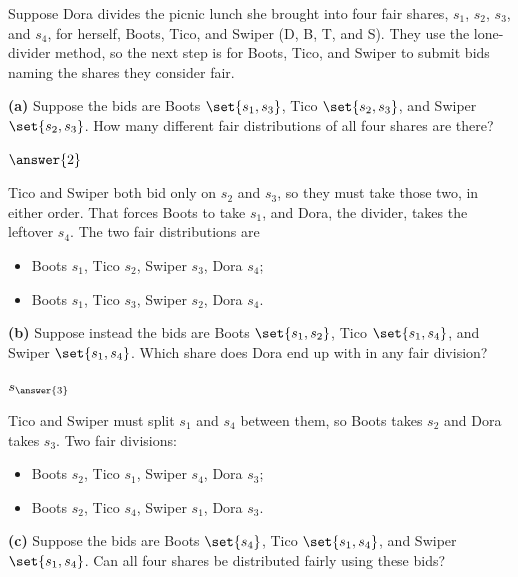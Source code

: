 \documentclass[12pt]{ximera}
\begin{document}
\begin{problem}
Suppose Dora divides the picnic lunch she brought into four fair shares, $s_1$, $s_2$,
$s_3$, and $s_4$, for herself, Boots, Tico, and Swiper (D, B, T, and S). They use the
lone-divider method, so the next step is for Boots, Tico, and Swiper to submit bids
naming the shares they consider fair.

\begin{prompt}
\textbf{(a)} Suppose the bids are Boots $\set{s_1,s_3}$, Tico $\set{s_2,s_3}$, and Swiper
$\set{s_2,s_3}$. How many different fair distributions of all four shares are there?

$\answer{2}$

\begin{feedback}
Tico and Swiper both bid only on $s_2$ and $s_3$, so they must take those two, in
either order. That forces Boots to take $s_1$, and Dora, the divider, takes the
leftover $s_4$. The two fair distributions are
\begin{itemize}
\item Boots $s_1$, Tico $s_2$, Swiper $s_3$, Dora $s_4$;
\item Boots $s_1$, Tico $s_3$, Swiper $s_2$, Dora $s_4$.
\end{itemize}
\end{feedback}
\end{prompt}

\begin{prompt}
\textbf{(b)} Suppose instead the bids are Boots $\set{s_1,s_2}$, Tico $\set{s_1,s_4}$, and
Swiper $\set{s_1,s_4}$. Which share does Dora end up with in any fair division?

$s_{\answer{3}}$

\begin{feedback}
Tico and Swiper must split $s_1$ and $s_4$ between them, so Boots takes $s_2$ and Dora
takes $s_3$. Two fair divisions:
\begin{itemize}
\item Boots $s_2$, Tico $s_1$, Swiper $s_4$, Dora $s_3$;
\item Boots $s_2$, Tico $s_4$, Swiper $s_1$, Dora $s_3$.
\end{itemize}
\end{feedback}
\end{prompt}

\begin{prompt}
\textbf{(c)} Suppose the bids are Boots $\set{s_4}$, Tico $\set{s_1,s_4}$, and Swiper
$\set{s_1,s_4}$. Can all four shares be distributed fairly using these bids?


\end{prompt}
\end{problem}
\end{document}
